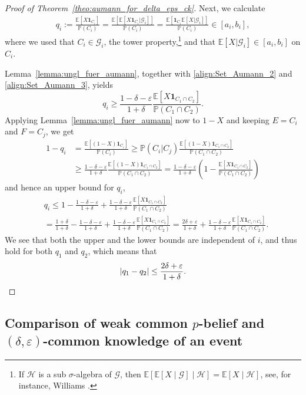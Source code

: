 \documentclass[a4paper, 10pt]{article}
\numberwithin{theorem}{section}
\theoremstyle{definition}
\newcommand{\E}{\mathbb{E}}
\newcommand{\G}{\mathcal{G}}
\newcommand{\ind}[1]{\mathbf{1}_{#1}}
\renewcommand{\epsilon}{\varepsilon}
\renewcommand{\P}{\mathbb{P}}
\begin{document}
\begin{proof}[Proof of Theorem~\ref{theo:aumann_for_delta_eps_ck}]
	Next, we calculate
	\begin{align}\label{align:Set_Aumann_3}
		q_i:= \frac{\E[X\ind{C_i}]}{\P(C_i)} = \frac{\E[\E[X\ind{C_i}|\G_i]]}{\P(C_i)} =  \frac{\E[\ind{C_i}\E[X|\G_i]]}{\P(C_i)} \in [a_i,b_i], 
	\end{align}
	where we used that $C_i \in \G_i$, the tower property,\footnote{If 
		$\mathcal{H}$ is a sub $\sigma$-algebra of $\G$, then $\E [\E [X \mid \G]\mid \mathcal{H} ] = \E [X \mid \mathcal{H}]$, see, for instance, Williams \cite[p.\ 88]{Wi91}.}  and that $\E[X|\G_i] \in [a_i,b_i]$  on $C_i$.
	
	Lemma~\ref{lemma:ungl_fuer_aumann}, together with \eqref{align:Set_Aumann_2} and \eqref{align:Set_Aumann_3}, yields
	$$q_i \geq \frac{1-\delta-\epsilon}{1+\delta} \frac{\E[X \ind{ C_1\cap C_2}]}{\P(C_1\cap C_2)}.$$
	Applying Lemma~\ref{lemma:ungl_fuer_aumann} now to $1-X$ and keeping $E=C_i$ and $F=C_j$, we get 
	\begin{align*}
	1-q_i  &=	\frac{\E[(1-X) \ind{C_i}]}{\P(C_i)} \geq \P(C_i|C_j) \frac{\E[(1-X) \ind{ C_1\cap C_2}]}{\P(C_1\cap C_2)} \\
	&\geq  \frac{1-\delta-\epsilon}{1+\delta}\frac{\E[(1-X) \ind{ C_1\cap C_2}]}{\P(C_1\cap C_2)} = \frac{1-\delta-\epsilon}{1+\delta} \left(1- \frac{\E[X \ind{ C_1\cap C_2}]}{\P(C_1\cap C_2)}\right)
	\end{align*} 
and hence an upper bound for $q_i$,
\begin{align*}
	&q_i \leq  1 - \frac{1-\delta-\epsilon}{1+\delta} +  \frac{1-\delta-\epsilon}{1+\delta} \frac{\E[X \ind{ C_1\cap C_2}]}{\P(C_1\cap C_2)} \\
	 &= \frac{1+\delta}{1+\delta} - \frac{1-\delta-\epsilon}{1+\delta} +  \frac{1-\delta-\epsilon}{1+\delta} \frac{\E[X \ind{ C_1\cap C_2}]}{\P(C_1\cap C_2)} = \frac{2\delta+\epsilon}{1+\delta} + \frac{1-\delta-\epsilon}{1+\delta} \frac{\E[X \ind{ C_1\cap C_2}]}{\P(C_1\cap C_2)}.
\end{align*}	
	We see that both the upper and the lower bounds are independent of $i$, and thus hold for both $q_1$ and $q_2$, which means that
	\[|q_1-q_2| \leq \frac{2\delta+\epsilon}{1+\delta}.\qedhere\]
\end{proof}



\boldmath
\subsection{Comparison of weak common $p$-belief and $(\delta,\epsilon)$-common knowledge of an  event}\label{Sec-comparision}
\unboldmath
\end{document}
